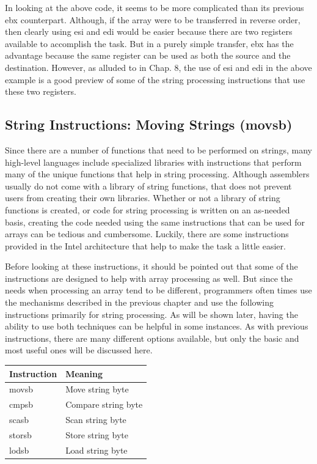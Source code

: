 \documentclass[10pt]{article}
\begin{document}
In looking at the above code, it seems to be more complicated than its previous ebx counterpart. Although, if the array were to be transferred in reverse order, then clearly using esi and edi would be easier because there are two registers available to accomplish the task. But in a purely simple transfer, ebx has the advantage because the same register can be used as both the source and the destination. However, as alluded to in Chap. 8, the use of esi and edi in the above example is a good preview of some of the string processing instructions that use these two registers.

\subsection*{String Instructions: Moving Strings (movsb)}
Since there are a number of functions that need to be performed on strings, many high-level languages include specialized libraries with instructions that perform many of the unique functions that help in string processing. Although assemblers usually do not come with a library of string functions, that does not prevent users from creating their own libraries. Whether or not a library of string functions is created, or code for string processing is written on an as-needed basis, creating the code needed using the same instructions that can be used for arrays can be tedious and cumbersome. Luckily, there are some instructions provided in the Intel architecture that help to make the task a little easier.

Before looking at these instructions, it should be pointed out that some of the instructions are designed to help with array processing as well. But since the needs when processing an array tend to be different, programmers often times use the mechanisms described in the previous chapter and use the following instructions primarily for string processing. As will be shown later, having the ability to use both techniques can be helpful in some instances. As with previous instructions, there are many different options available, but only the basic and most useful ones will be discussed here.

\begin{center}
\begin{tabular}{|l|l|}
\hline
Instruction & Meaning \\
\hline
movsb & Move string byte \\
\hline
cmpsb & Compare string byte \\
\hline
scasb & Scan string byte \\
\hline
storsb & Store string byte \\
\hline
lodsb & Load string byte \\
\hline
\end{tabular}
\end{center}
\end{document}
